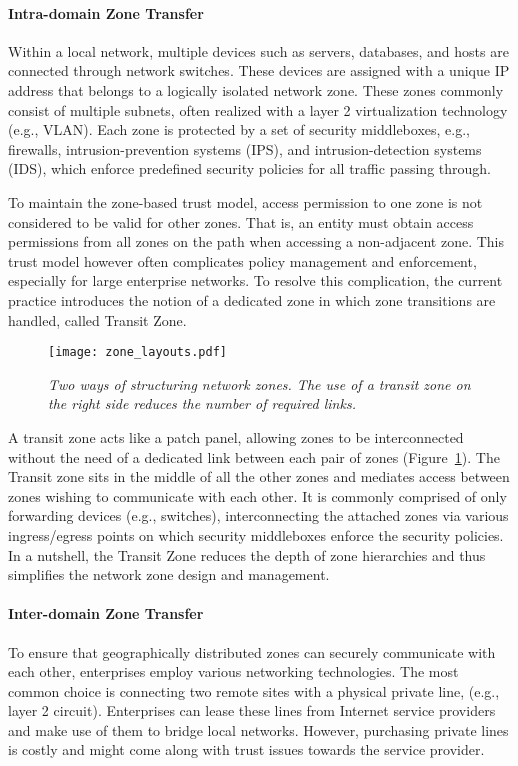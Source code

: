 \paragraph{Intra-domain Zone Transfer}
Within a local network, multiple devices such as servers, databases, and hosts are connected
through network switches. These devices are assigned with a unique IP address that belongs
to a logically isolated network zone. These zones commonly consist of multiple subnets,
often realized with a layer 2 virtualization technology (e.g., VLAN). Each zone is protected
by a set of security middleboxes, e.g., firewalls, intrusion-prevention systems (IPS),
and intrusion-detection systems (IDS), which enforce predefined security policies for all
traffic passing through.

To maintain the zone-based trust model, access permission to one zone is not considered to be
valid for other zones. That is, an entity must obtain access permissions from all zones on the
path when accessing a non-adjacent zone. This trust model however often complicates policy management
and enforcement, especially for large enterprise networks.
To resolve this complication, the current practice introduces the notion of a dedicated zone in which zone
transitions are handled, called Transit Zone.

\begin{figure}[htb]
	\begin{center}
		\texttt{[image: zone\_layouts.pdf]}
	\end{center}
	\caption{\textit{Two ways of structuring network zones. The use of a transit zone on the right side reduces
			the number of required links.}}
	\label{fig:zone_layout}
\end{figure}

A transit zone acts like a patch panel, allowing zones to be interconnected without the need
of a dedicated link between each pair of zones (Figure~\ref{fig:zone_layout}).
The Transit zone sits in the middle of all
the other zones and mediates access between zones wishing to communicate with each other.
It is commonly comprised of only forwarding devices (e.g., switches), interconnecting the
attached zones via various ingress/egress points on which security middleboxes enforce the
security policies. In a nutshell, the Transit Zone reduces the depth of zone hierarchies and
thus simplifies the network zone design and management.

\paragraph{Inter-domain Zone Transfer}
To ensure that geographically distributed zones can securely communicate with each other,
enterprises employ various networking technologies. The most common choice is connecting
two remote sites with a physical private line, (e.g., layer 2 circuit). Enterprises
can lease these lines from Internet service providers and make use of them to bridge local
networks. However, purchasing private lines is costly and might come along
with trust issues towards the service provider.

